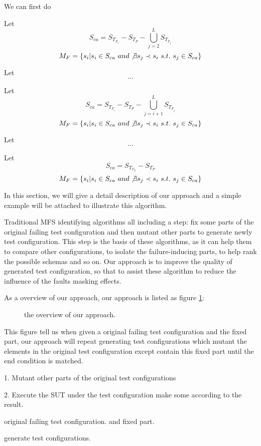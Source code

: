 \documentclass{sig-alternate}
\begin{document}
We can first do

Let $$S_{ca} =S_{T_{F_{1}}} - S_{T_{P}} - \bigcup_{j = 2}^{L}S_{T_{F_{j}}}$$
$$M_{F} = \{s_{i} | s_{i} \in S_{ca}\ and \not\exists s_{j} \prec s_{i}\ s.t.\ s_{j} \in S_{ca} \}$$

Let $$...$$

Let $$S_{ca} =S_{T_{F_{i}}} - S_{T_{P}} - \bigcup_{j = i+1}^{L}S_{T_{F_{j}}}$$
$$M_{F} = \{s_{i} | s_{i} \in S_{ca}\ and \not\exists s_{j} \prec s_{i}\ s.t.\ s_{j} \in S_{ca} \}$$

Let $$...$$

Let $$S_{ca} =S_{T_{F_{L}}} - S_{T_{P}}$$
$$M_{F} = \{s_{i} | s_{i} \in S_{ca}\ and \not\exists s_{j} \prec s_{i}\ s.t.\ s_{j} \in S_{ca} \}$$


In this section, we will give a detail description of our approach and a simple example will be attached to illustrate this algorithm.

Traditional MFS identifying algorithms all including a step: fix some parts of the original failing test configuration and then mutant other parts  to generate newly test configuration. This step is the basis of these algorithms, as it can help them to compare other configurations, to isolate the failure-inducing parts, to help rank the possible schemas and so on. Our approach is to improve the quality of generated test configuration, so that to assist these algorithm to reduce the influence of the faults masking effects.

As a overview of our approach, our approach is listed as figure \ref{framework}:

\begin{figure}
\centering
\label{framework}
\caption{the overview of our approach.}
\end{figure}

This figure tell us when given a original failing test configuration and the fixed part, our approach will repeat generating test configurations which mutant the elements in the original test configuration except contain this fixed part until the end condition is matched.



1. Mutant other parts of the original test configurations

2. Execute the SUT under the test configuration make some  according to the result.

original failing test configuration.  and fixed part.

generate test configurations.
\end{document}
